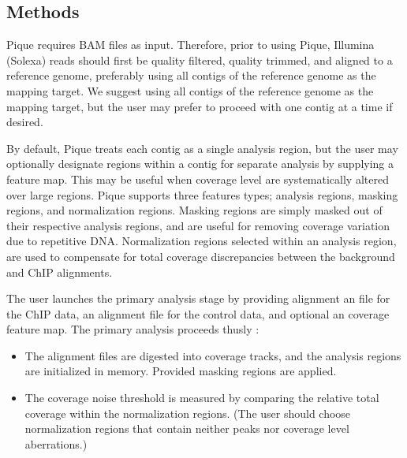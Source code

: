 \documentclass{bioinfo}
\begin{document}
\begin{methods}
\section{Methods}

\noindent Pique requires BAM files as input\cite{sam_format}.
Therefore, prior to using Pique, Illumina (Solexa) reads should first
be quality filtered, quality trimmed, and aligned to a reference
genome, preferably using all contigs of the reference genome as the
mapping target. We suggest using all contigs of the reference genome
as the mapping target, but the user may prefer to proceed with one
contig at a time if desired.

By default, Pique treats each contig as a single analysis region, but
the user may optionally designate regions within a contig for separate
analysis by supplying a feature map.  This may be useful when coverage
level are systematically altered over large regions.  Pique supports
three features types; analysis regions, masking regions, and
normalization regions. Masking regions are simply masked out of their
respective analysis regions, and are useful for removing coverage
variation due to repetitive DNA. Normalization regions selected within
an analysis region, are used to compensate for total coverage
discrepancies between the background and ChIP alignments.

The user launches the primary analysis stage by providing alignment an
file for the ChIP data, an alignment file for the control data, and
optional an coverage feature map. The primary analysis proceeds thusly
:

\begin{itemize}

\item The alignment files are digested into coverage tracks, and the
  analysis regions are initialized in memory. Provided masking regions
  are applied.

\item The coverage noise threshold is measured by comparing the
  relative total coverage within the normalization regions. (The user
  should choose normalization regions that contain neither peaks nor
  coverage level aberrations.)

%


\end{itemize}
\end{methods}
\end{document}
